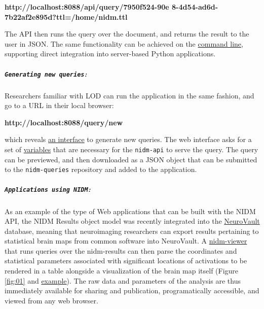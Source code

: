 \documentclass[twocolumn]{bmcart}%
\begin{document}
\textbf{http://localhost:8088/api/query/7950f524-90e 8-4d54-ad6d-7b22af2e895d?ttl=/home/nidm.ttl}\newline

The API then runs the query over the document, and returns the result to the user in JSON. The same functionality can be achieved on the \href{http://nidm-api.readthedocs.org/en/latest/getting-started.html#integration-into-python}{command line}, supporting direct integration into server-based Python applications.\newline

\subparagraph{\texorpdfstring{\texttt{Generating new queries}:}{:}}\label{section}
Researchers familiar with LOD can run the application in the same fashion, and go to a URL in their local browser:\newline

\textbf{http://localhost:8088/query/new}\newline

which reveals \href{http://nidm-api.readthedocs.org/en/latest/development.html#web-query-generator}{an interface} to generate new queries. The web interface asks for a set of \href{http://nidm-api.readthedocs.org/en/latest/development.html#fields}{variables} that are necessary for the \texttt{nidm-api} to serve the query. The query can be previewed, and then downloaded as a JSON object that can be submitted to the \texttt{nidm-queries} repository and added to the application.\newline

\subparagraph{\texorpdfstring{\texttt{Applications using NIDM}:}{:}}\label{section}
As an example of the type of Web applications that can be built with the NIDM API, the NIDM Results object model \cite{noauthor_undated-if} was recently integrated into the \href{http://www.neurovault.org}{NeuroVault} database, meaning that neuroimaging researchers can export results pertaining to statistical brain maps from common software \cite{Jenkinson2012-pr} into NeuroVault. A \href{https://github.com/vsoch/nidmviewer}{nidm-viewer} that runs queries over the nidm-results can then parse the coordinates and statistical parameters associated with significant locations of activations to be rendered in a table alongside a visualization of the brain map itself (Figure \ref{fig:01} and \href{http://neurovault.org/collections/877/fsl_course_av.nidm}{example}). The raw data and parameters of the analysis are thus immediately available for sharing and publication, programatically accessible, and viewed from any web browser. 
\end{document}
